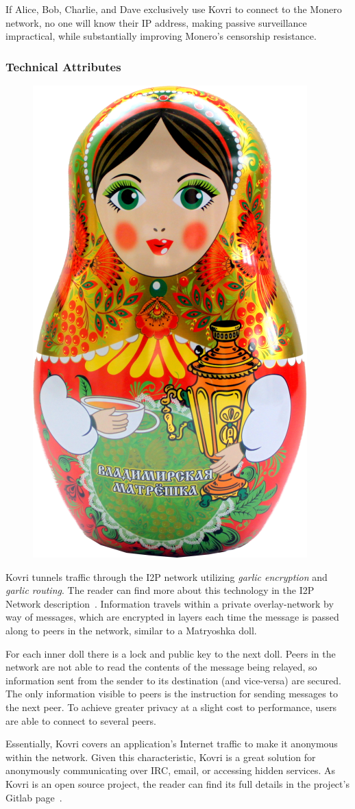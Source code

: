If Alice, Bob, Charlie, and Dave exclusively use Kovri to connect to the Monero network, no one will know their IP address, making passive surveillance impractical, while substantially improving Monero's censorship resistance.

\subsubsection{Technical Attributes}
\begin{figure}
\centering
\includegraphics[height=0.20\textwidth]{Images/Kovri/doll.png}
\end{figure}
Kovri tunnels traffic through the I2P network utilizing \emph{garlic encryption} and \emph{garlic routing}. The reader can find more about this technology in the I2P Network description~\cite{i2p}. Information travels within a private overlay-network by way of messages, which are encrypted in layers each time the message is passed along to peers in the network, similar to a Matryoshka doll.

For each inner doll there is a lock and public key to the next doll. Peers in the network are not able to read the contents of the message being relayed, so information sent from the sender to its destination (and vice-versa) are secured. The only information visible to peers is the instruction for sending messages to the next peer. To achieve greater privacy at a slight cost to performance, users are able to connect to several peers.

Essentially, Kovri covers an application's Internet traffic to make it anonymous within the network. Given this characteristic, Kovri is a great solution for anonymously communicating over IRC, email, or accessing hidden services. As Kovri is an open source project, the reader can find its full details in the project's Gitlab page~\cite{git_kovri}.
